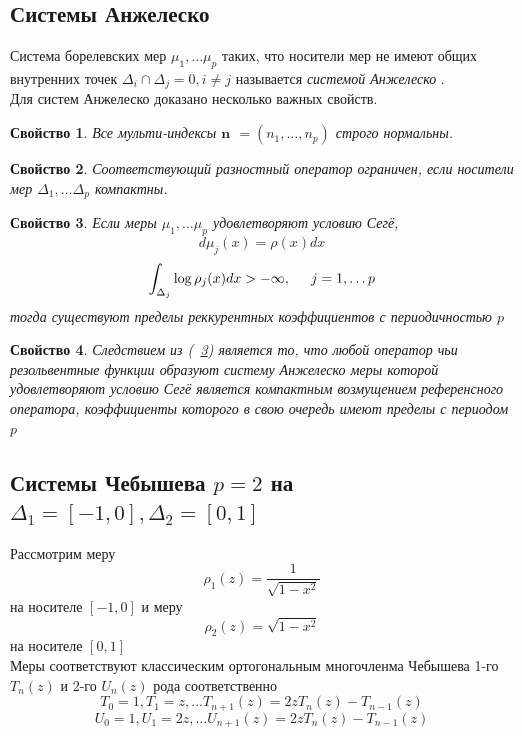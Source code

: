 \documentclass{report}
\newtheorem{prope}{Свойство} [chapter]
\begin{document}
\subsection {Системы Анжелеско}
Система борелевских мер $\mu_1,\ldots \mu_p$ таких, что носители мер не имеют
общих внутренних точек ${\Delta_i}\cap{\Delta_j} = 0, i\not=j $ называется \emph {системой Анжелеско} . \\
Для систем Анжелеско доказано несколько важных свойств.
\begin{prope}
Все мульти-индексы $\textbf {n} $ $=(n_1,\ldots,n_p)$ строго нормальны.
\end{prope}
\begin{prope}
Соответствующий разностный оператор ограничен, если носители мер $\Delta_1, \ldots \Delta_p$ компактны.
\end{prope}
\begin{prope}
\label{Angelesco.limits}
Если меры $\mu_1, \ldots \mu_p$ удовлетворяют условию Сег\"{е}, 
$$
d\mu_j(x)=\rho(x)dx
$$
$$
\int_{\Delta_j} \log \rho_j(x) dx > - \infty, \hspace{0.5cm} j=1,\ldots p
$$
тогда существуют пределы реккурентных коэффициентов с периодичностью $p$  
\end{prope}
\begin{prope}
Следствием из (~\ref{Angelesco.limits}) является то, что любой оператор чьи резольвентные функции образуют систему Анжелеско меры которой удовлетворяют условию Сег\"{е} является компактным возмущением референсного оператора, коэффициенты которого в свою очередь имеют пределы с периодом $p$ 
\end{prope}



\newpage
\subsection {Системы Чебышева $p=2$ на $\Delta_1=[-1,0], \Delta_2 =[0,1]$}
Рассмотрим меру $$\rho_1(z)=\displaystyle\frac{1}{\sqrt{1-x^2}}$$ на носителе  $[-1,0]$ и меру $$\rho_2(z)=\sqrt{1-x^2}$$ на носителе $[0,1]$ \\
Меры соответствуют классическим ортогональным многочленма Чебышева 1-го $T_n(z)$ и 2-го $U_n(z)$ рода соответственно
$$
T_0 = 1, T_1=z, \ldots T_{n+1}(z)=2zT_n(z)-T_{n-1}(z)
$$
$$
U_0 = 1, U_1=2z, \ldots U_{n+1}(z)=2zT_n(z)-T_{n-1}(z)
$$
\end{document}
